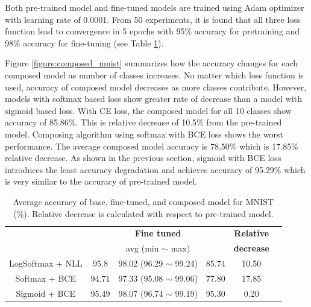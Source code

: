 \documentclass{article}
\begin{document}
Both pre-trained model and fine-tuned models are trained using Adam optimizer with learning rate of 0.0001. From 50 experiments, it is found that all three loss function lead to convergence in 5 epochs with 95\% accuracy for pretraining and 98\% accuracy for fine-tuning (see Table \ref{table:mnist}).

Figure \ref{figure:composed_mnist} summarizes how the accuracy changes for each composed model as number of classes increases. No matter which loss function is used, accuracy of composed model decreases as more classes contribute. However, models with softmax based loss show greater rate of decrease than a model with sigmoid based loss. With CE loss, the composed model for all 10 classes show accuracy of 85.86\%. This is relative decrease of 10.5\% from the pre-trained model. Composing algorithm using softmax with BCE loss shows the worst performance. The average composed model accuracy is 78.50\% which is 17.85\% relative decrease. As shown in the previous section, sigmoid with BCE loss introduces the least accuracy degradation and achieves accuracy of 95.29\% which is very similar to the accuracy of pre-trained model.

\begin{table}[t]
    \centering
    \begin{tabular}{cccccc}
        \toprule[1pt]
        \multirow{2}{*}{\raisebox{-3\heavyrulewidth}{\bf Loss function}} &
        \multirow{2}{*}{\raisebox{-3\heavyrulewidth}{\bf Pre-trained }} &
        \textbf{Fine tuned} &
        \multirow{2}{*}{\raisebox{-3\heavyrulewidth}{ \bf Composed }} &
        \textbf{ Relative } \\
        & & avg (min $\sim$ max) & & \textbf{ decrease } \\
        \midrule
        LogSoftmax + NLL & 95.8 & 98.02 (96.29 $\sim$ 99.24) & 85.74 & 10.50 \\
        Softmax + BCE & 94.71 & 97.33 (95.08 $\sim$ 99.06) & 77.80 & 17.85 \\
        Sigmoid + BCE & 95.49 & 98.07 (96.74 $\sim$ 99.19) & 95.30 & 0.20 \\
        \bottomrule[1pt]
    \end{tabular}
    \caption{Average accuracy of base, fine-tuned, and composed model for MNIST (\%). Relative decrease is calculated with respect to pre-trained model.}
    \label{table:mnist}
\end{table}
\end{document}
